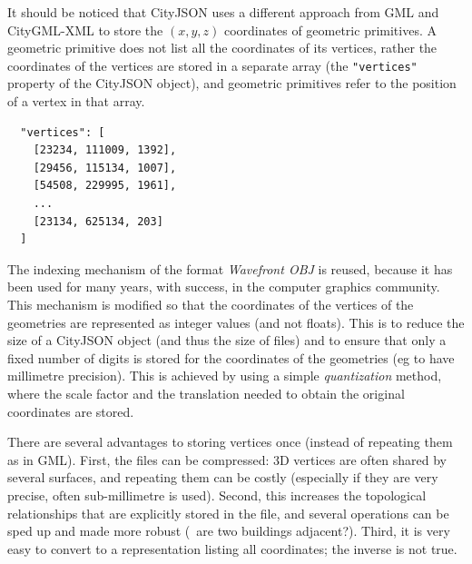 It should be noticed that CityJSON uses a different approach from GML and CityGML-XML to store the $(x,y,z)$ coordinates of geometric primitives.
A geometric primitive does not list all the coordinates of its vertices, rather the coordinates of the vertices are stored in a separate array (the \texttt{"vertices"} property of the CityJSON object), and geometric primitives refer to the position of a vertex in that array.
\begin{lstlisting}
  "vertices": [
    [23234, 111009, 1392],
    [29456, 115134, 1007],
    [54508, 229995, 1961],
    ...
    [23134, 625134, 203]
  ]
\end{lstlisting}
The indexing mechanism of the format \emph{Wavefront OBJ} is reused, because it has been used for many years, with success, in the computer graphics community.
This mechanism is modified so that the coordinates of the vertices of the geometries are represented as integer values (and not floats).
This is to reduce the size of a CityJSON object (and thus the size of files) and to ensure that only a fixed number of digits is stored for the coordinates of the geometries (eg to have millimetre precision).
This is achieved by using a simple \emph{quantization} method, 
where the scale factor and the translation needed to obtain the original coordinates are stored.

There are several advantages to storing vertices once (instead of repeating them as in GML).
First, the files can be compressed: 3D vertices are often shared by several surfaces, and repeating them can be costly (especially if they are very precise, often sub-millimetre is used).
Second, this increases the topological relationships that are explicitly stored in the file, and several operations can be sped up and made more robust (\eg\ are two buildings adjacent?).
Third, it is very easy to convert to a representation listing all coordinates; the inverse is not true. 

%

